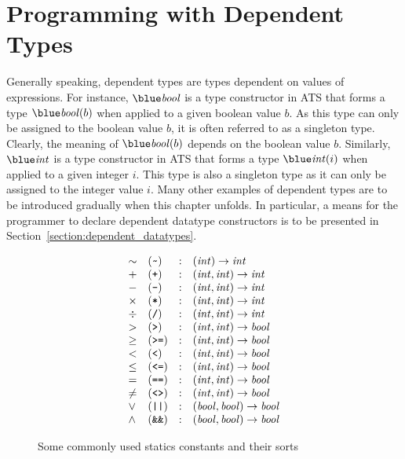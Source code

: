 \chapter{Programming with Dependent Types}

Generally speaking, dependent types are types dependent on values of
expressions. For instance, $\tbool$ is a type constructor in ATS that forms
a type $\tbool(b)$ when applied to a given boolean value $b$. As this type
can only be assigned to the boolean value $b$, it is often referred to as a
singleton type. Clearly, the meaning of $\tbool(b)$ depends on the boolean
value $b$.  Similarly, $\tint$ is a type constructor in ATS that forms a
type $\tint(i)$ when applied to a given integer $i$. This type is also a
singleton type as it can only be assigned to the integer value $i$.  Many
other examples of dependent types are to be introduced gradually when this
chapter unfolds.  In particular, a means for the programmer to declare
dependent datatype constructors is to be presented in
Section~\ref{section:dependent_datatypes}.

\begin{figure}
\[\begin{array}{llcl}
\sim & (\verb`~`) & : & (\sint) \simp \sint \\
+ & (\verb`+`) & : & (\sint, \sint) \simp \sint \\
- & (\verb`-`) & : & (\sint, \sint) \simp \sint \\
\times & (\verb`*`) & : & (\sint, \sint) \simp \sint \\
\div & (\verb`/`) & : & (\sint, \sint) \simp \sint \\
> & (\verb`>`) & : & (\sint, \sint) \simp \sbool \\
\geq & (\verb`>=`) & : & (\sint, \sint) \simp \sbool \\
< & (\verb`<`) & : & (\sint, \sint) \simp \sbool \\
\leq & (\verb`<=`) & : & (\sint, \sint) \simp \sbool \\
= & (\verb`==`) & : & (\sint, \sint) \simp \sbool \\
\neq & (\verb`<>`) & : & (\sint, \sint) \simp \sbool \\
\lor & (\verb`||`) & : & (\sbool, \sbool) \simp \sbool \\
\land & (\verb`&&`) & : & (\sbool, \sbool) \simp \sbool \\
\end{array}\]
\caption{Some commonly used statics constants and their sorts}
\label{figure:static_constants}
\end{figure}
